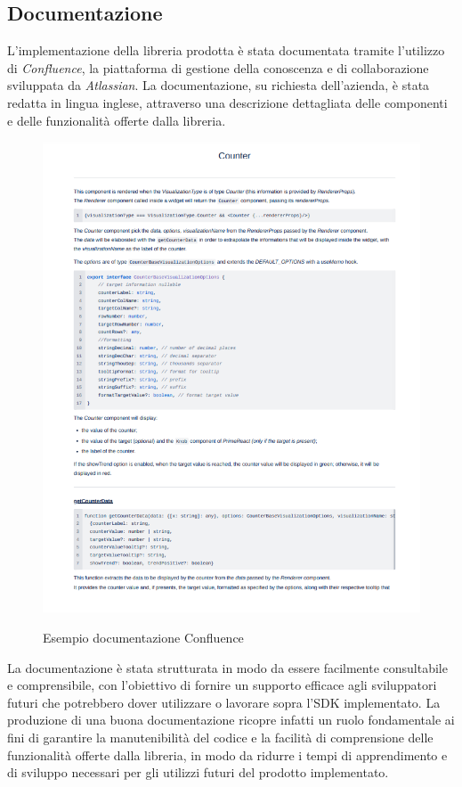 \subsection{Documentazione}
L'implementazione della libreria prodotta è stata documentata tramite l'utilizzo di \textit{Confluence}, la piattaforma
di gestione della conoscenza e di collaborazione sviluppata da \textit{Atlassian}. \newline
La documentazione, su richiesta dell'azienda, è stata redatta in lingua inglese, attraverso una descrizione dettagliata
delle componenti e delle funzionalità offerte dalla libreria. \newline

\begin{figure}[H]
    \centering
    \includegraphics[alt={Esempio documentazione \textit{Confluence}}, width=1 \textwidth]{img/ex_confluence.png}
    \caption{Esempio documentazione Confluence}
    \label{fig:ex_confluence}
\end{figure}

La documentazione è stata strutturata in modo da essere facilmente consultabile e comprensibile, con l'obiettivo di
fornire un supporto efficace agli sviluppatori futuri che potrebbero dover utilizzare o lavorare sopra l'SDK implementato. \newline
La produzione di una buona documentazione ricopre infatti un ruolo fondamentale ai fini di garantire la manutenibilità
del codice e la facilità di comprensione delle funzionalità offerte dalla libreria, in modo da ridurre i tempi di
apprendimento e di sviluppo necessari per gli utilizzi futuri del prodotto implementato.

